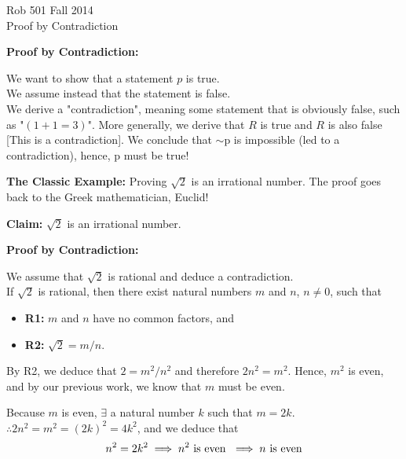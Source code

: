\documentclass[letterpaper]{article}
\begin{document}
\baselineskip=48pt  %


\setlength{\parskip}{.3in}
\setlength{\itemsep}{.3in}

\pagestyle{plain}

{\Large \bf
\begin{center}
Rob 501 Fall 2014\\
Proof by Contradiction
\end{center}
}

\Large



\textbf{Proof by Contradiction:}

We want to show that a statement $p$ is true.\\
We assume instead that the statement is false.\\
We derive a "contradiction", meaning some statement that is obviously false, such as "$(1+1=3)$". More generally, we derive that $R$ is true and $R$ is also false [This is a contradiction].
We conclude that $\sim$p is impossible (led to a contradiction), hence, p must be true!

\textbf{The Classic Example:} Proving $\sqrt{2}$ is an irrational number. The proof goes back to the Greek mathematician, Euclid!

\textbf{Claim:} $\sqrt{2}$ is an irrational number.

\textbf{Proof by Contradiction:}

We assume that $\sqrt{2}$ is rational and deduce a contradiction.\\

If $\sqrt{2}$ is rational, then there exist natural numbers $m$ and $n$, $n\neq 0$, such that

\begin{itemize}
\item \textbf{R1:} $m$ and $n$ have no common factors, and
\item \textbf{R2:} $\sqrt{2} = m/n$.
\end{itemize}

By R2, we deduce that $2 = m^2/n^2$ and therefore $2n^2 = m^2$. Hence, $m^2$ is even, and by our previous work, we know that $m$ must be even.

Because $m$ is even, $\exists$ a natural number $k$ such that $m=2k$.\\

$\therefore 2n^2 = m^2 = (2k)^2 = 4k^2$, and we deduce that
$$n^2 = 2k^2 \implies n^2 \textnormal{ is even } \implies n \textnormal{ is even}$$
\end{document}
